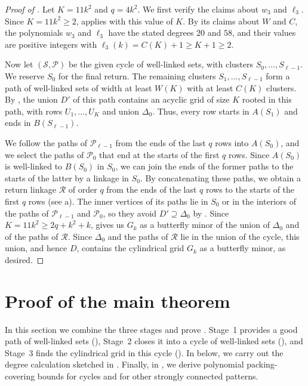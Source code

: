 \documentclass[fontsize=12pt,leading=14pt]{fullpaper}
\newcommand{\Pcal}{\mathcal{P}}
\newcommand{\Rcal}{\mathcal{R}}
\newcommand{\Scal}{\mathcal{S}}
\newcounter{step}
\begin{document}
\begin{proof}[Proof of ]
  Let $K=11k^2$ and $q=4k^2$.
  We first verify the claims about $w_3$ and $\ell_3$.
  Since $K=11k^2\ge2$,  applies with this value of $K$.
  By its claims about $W$ and $C$, the polynomials $w_3$ and $\ell_3$ have the stated degrees $20$ and $58$, and their values are positive integers with $\ell_3(k)=C(K)+1\ge K+1\ge2$.

  Now let $(\Scal,\Pcal)$ be the given cycle of well-linked sets, with clusters $S_0,\dots,S_{\ell-1}$.
  We reserve $S_0$ for the final return.
  The remaining clusters $S_1,\dots,S_{\ell-1}$ form a path of well-linked sets of width at least $W(K)$ with at least $C(K)$ clusters.
  By , the union $D'$ of this path contains an acyclic grid of size $K$ rooted in this path, with rows $U_1,\dots,U_K$ and union $\Delta_0$.
  Thus, every row starts in $A(S_1)$ and ends in $B(S_{\ell-1})$.

  We follow the paths of $\Pcal_{\ell-1}$ from the ends of the last $q$ rows into $A(S_0)$, and we select the paths of $\Pcal_0$ that end at the starts of the first $q$ rows.
  Since $A(S_0)$ is well-linked to $B(S_0)$ in $S_0$, we can join the ends of the former paths to the starts of the latter by a linkage in $S_0$.
  By concatenating these paths, we obtain a return linkage $\Rcal$ of order $q$ from the ends of the last $q$ rows to the starts of the first $q$ rows (see a).
  The inner vertices of its paths lie in $S_0$ or in the interiors of the paths of $\Pcal_{\ell-1}$ and $\Pcal_0$, so they avoid $D'\supseteq\Delta_0$ by .
  Since $K=11k^2\ge2q+k^2+k$,  gives us $G_k$ as a butterfly minor of the union of $\Delta_0$ and of the paths of $\Rcal$.
  Since $\Delta_0$ and the paths of $\Rcal$ lie in the union of the cycle, this union, and hence $D$, contains the cylindrical grid $G_k$ as a butterfly minor, as desired.
\end{proof}

%
\section{Proof of the main theorem}\label{sec:main}

In this section we combine the three stages and prove .
Stage~1 provides a good path of well-linked sets (), Stage~2 closes it into a cycle of well-linked sets (), and Stage~3 finds the cylindrical grid in this cycle ().
In  below, we carry out the degree calculation sketched in .
Finally, in , we derive polynomial packing-covering bounds for cycles and for other strongly connected patterns.
\end{document}
